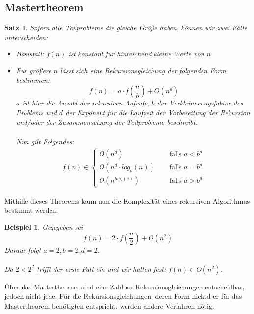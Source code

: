 \documentclass[11pt,a4paper]{scrartcl}
\newtheorem{satz}{Satz}
\newtheorem{example}{Beispiel}
\begin{document}
\subsection{Mastertheorem}
\begin{satz} Sofern alle Teilprobleme die gleiche Größe haben, können wir zwei Fälle unterscheiden: 
\begin{itemize}
\item Basisfall: $f(n)$ ist konstant für hinreichend kleine Werte von $n$
\item Für größere $n$ lässt sich eine Rekursionsgleichung der folgenden Form bestimmen: 
\[f(n) = a \cdot f(\frac{n}{b}) + O(n^{d})\]
$a$ ist hier die Anzahl der rekursiven Aufrufe, $b$ der Verkleinerungsfaktor des Problems und $d$ der Exponent für die Laufzeit der Vorbereitung der Rekursion und/oder der Zusammensetzung der Teilprobleme beschreibt. \\\\
Nun gilt Folgendes: \\
\begin{align*}
f(n) \in 
\begin{cases}
O(n^{d}) \quad & \text{ falls } a < b^{d} \\
O(n^{d} \cdot log_{b}(n)) \quad & \text{ falls } a = b^{d} \\
O(n^{log_{b}(a)}) \quad & \text{ falls } a > b^{d}
\end{cases}
\end{align*}
\end{itemize}
\end{satz}
Mithilfe dieses Theorems kann nun die Komplexität eines rekursiven Algorithmus bestimmt werden:
\begin{example}
Gegegeben sei \[f(n) = 2 \cdot f(\frac{n}{2}) + O(n^{2})\] 
Daraus folgt $ a = 2, b = 2, d = 2$. \\\\
Da $2 < 2^{2}$ trifft der erste Fall ein und wir halten fest: $f(n) \in O(n^{2})$.
\end{example}
Über das Mastertheorem sind eine Zahl an Rekursionsgleichungen entscheidbar, jedoch nicht jede. Für die Rekursionsgleichungen, deren Form nichtd er für das Mastertheorem benötigten entspricht, werden andere Verfahren nötig.
\end{document}
